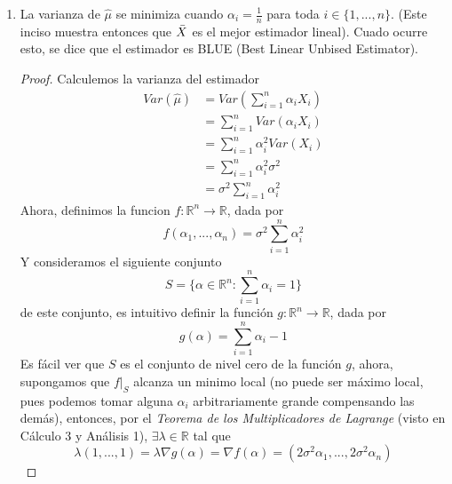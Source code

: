 \documentclass[10pt,a4paper]{article}
\theoremstyle{plain}
\theoremstyle{definition}
\theoremstyle{remark}
\newenvironment{prueba}{\renewcommand{\proofname}{Prueba}\renewcommand{\qedsymbol}{}\begin{proof}}{\end{proof}}
\begin{document}
\begin{enumerate}
\begin{enumerate}
        \item La varianza de $\hat{\mu}$ se minimiza cuando $\alpha_i = \frac{1}{n}$ para toda $i\in\{1,...,n\}$. (Este inciso muestra entonces que $\Bar{X}$ es el mejor estimador lineal). Cuado ocurre esto, se dice que el estimador es BLUE (Best Linear Unbised Estimator).
        \begin{prueba}
        Calculemos la varianza del estimador
        \begin{equation*}
            \begin{split}
                Var(\hat{\mu}) & = Var\left( \sum_{i=1}^{n}\alpha_i X_i \right) \\
                & = \sum_{i=1}^{n}Var(\alpha_i X_i) \\
                & = \sum_{i=1}^{n}\alpha_{i}^{2}Var(X_i)\\
                & = \sum_{i=1}^{n}\alpha_{i}^{2}\sigma^2\\
                & = \sigma^2\sum_{i=1}^{n}\alpha_{i}^{2}
            \end{split}
        \end{equation*}
        Ahora, definimos la funcion $f:\mathbb{R}^n \longrightarrow \mathbb{R}$, dada por
        \begin{equation*}
            f(\alpha_1,...,\alpha_n) = \sigma^2\sum_{i=1}^{n}\alpha_{i}^{2}
        \end{equation*}
        Y consideramos el siguiente conjunto
        \begin{equation*}
            S = \{ \alpha\in\mathbb{R}^{n} : \sum_{i=1}^{n}\alpha_{i} = 1 \}
        \end{equation*}
        de este conjunto, es intuitivo definir la función $g:\mathbb{R}^{n}\longrightarrow \mathbb{R}$, dada por 
        \begin{equation*}
            g(\alpha) = \sum_{i=1}^{n}\alpha_{i}-1
        \end{equation*}
        Es fácil ver que $S$ es el conjunto de nivel cero de la función $g$, ahora, supongamos que $f\vert_{S}$ alcanza un minimo local (no puede ser máximo local, pues podemos tomar alguna $\alpha_{i}$ arbitrariamente grande compensando las demás), entonces, por el \textit{Teorema de los Multiplicadores de Lagrange} (visto en Cálculo 3 y Análisis 1), $\exists \lambda\in\mathbb{R}$ tal que 
        \begin{equation*}
            \lambda(1,...,1) = \lambda\nabla g(\alpha) = \nabla f(\alpha) = (2\sigma^{2}\alpha_{1},...,2\sigma^{2}\alpha_{n})
        \end{equation*}

\end{prueba}
\end{enumerate}
\end{enumerate}
\end{document}
